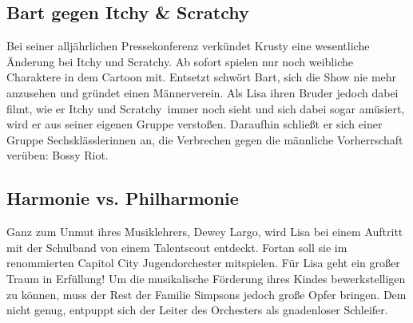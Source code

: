 
\subsection{Bart gegen Itchy \& Scratchy}
Bei seiner alljährlichen Pressekonferenz verkündet Krusty eine wesentliche Änderung bei \glqq Itchy und Scratchy\grqq. Ab sofort spielen nur noch weibliche Charaktere in dem Cartoon mit. Entsetzt schwört Bart, sich die Show nie mehr anzusehen und gründet einen Männerverein. Als Lisa ihren Bruder jedoch dabei filmt, wie er \glqq Itchy und Scratchy\grqq\ immer noch sieht und sich dabei sogar amüsiert, wird er aus seiner eigenen Gruppe verstoßen. Daraufhin schließt er sich einer Gruppe Sechsklässlerinnen an, die Verbrechen gegen die männliche Vorherrschaft verüben: Bossy Riot.


\subsection{Harmonie vs. Philharmonie}
Ganz zum Unmut ihres Musiklehrers, Dewey Largo, wird Lisa bei einem Auftritt mit der Schulband von einem Talentscout entdeckt. Fortan soll sie im renommierten Capitol City Jugendorchester mitspielen. Für Lisa geht ein großer Traum in Erfüllung! Um die musikalische Förderung ihres Kindes bewerkstelligen zu können, muss der Rest der Familie Simpsons jedoch große Opfer bringen. Dem nicht genug, entpuppt sich der Leiter des Orchesters als gnadenloser Schleifer.


